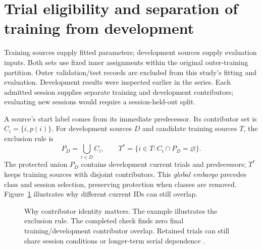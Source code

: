 \documentclass[10pt,a4paper]{article}
\begin{document}
\clearpage
\section{Trial eligibility and separation of training from development}
Training sources supply fitted parameters; development sources supply evaluation inputs. Both sets use fixed inner assignments within the original outer-training partition. Outer validation/test records are excluded from this study's fitting and evaluation. Development results were inspected earlier in the series. Each admitted session supplies separate training and development contributors; evaluating new sessions would require a session-held-out split.

A source's start label comes from its immediate predecessor. Its contributor set is $C_i=\{i,p(i)\}$. For development sources $D$ and candidate training sources $T$, the exclusion rule is
\begin{equation}
 P_D=\bigcup_{i\in D} C_i,\qquad T^*=\{i\in T:C_i\cap P_D=\varnothing\}.
\label{eq:embargo}
\end{equation}
The protected union $P_D$ contains development current trials and predecessors; $T^*$ keeps training sources with disjoint contributors. This \emph{global embargo} precedes class and session selection, preserving protection when classes are removed. Figure~\ref{fig:embargo} illustrates why different current IDs can still overlap.

\begin{figure}[h!]
\centering
{}
\caption{Why contributor identity matters. The example illustrates the exclusion rule. The completed check finds zero final training/development contributor overlap. Retained trials can still share session conditions or longer-term serial dependence \cite{contract,latest,reproduction}.}
\label{fig:embargo}
\end{figure}
\end{document}
